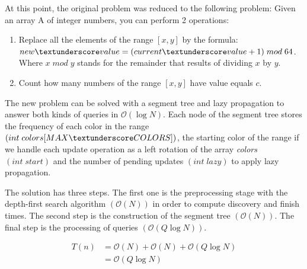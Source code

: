 At this point, the original problem was reduced to the following problem: Given an array A of integer numbers, you can perform 2 operations:

\begin{enumerate}
	\item Replace all the elements of the range $[x,y]$ by the formula: $new \textunderscore value = (current \textunderscore value + 1) \; mod \; 64$. Where $x \; mod \; y$ stands for the remainder that results of dividing $x$ by $y$.
	\item Count how many numbers of the range $[x,y]$ have value equals $c$.
\end{enumerate}

The new problem can be solved with a segment tree and lazy propagation to answer both kinds of queries in $\mathcal{O}(\log N)$. Each node of the segment tree stores the frequency of each color in the range $(int \; colors[MAX \textunderscore COLORS])$, the starting color of the range if we handle each update operation as a left rotation of the array \textit{colors} $(int \; start)$ and the number of pending updates $(int \; lazy)$ to apply lazy propagation.

The solution has three steps. The first one is the preprocessing stage with the depth-first search algorithm $(\mathcal{O}(N))$ in order to compute discovery and finish times. The second step is the construction of the segment tree $(\mathcal{O}(N))$. The final step is the processing of queries $(\mathcal{O}(Q \log N))$.

\begin{equation*} \label{eq1}
\begin{split}
T(n) & = \mathcal{O}(N) + \mathcal{O}(N) + \mathcal{O}(Q \log N) \\
     & = \mathcal{O}(Q \log N)
\end{split}
\end{equation*}